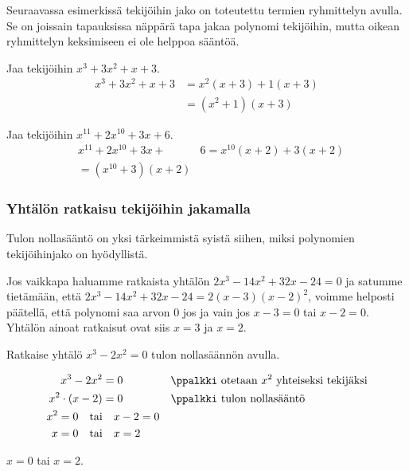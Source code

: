 Seuraavassa esimerkissä tekijöihin jako on toteutettu termien ryhmittelyn avulla. Se on joissain tapauksissa näppärä tapa jakaa polynomi tekijöihin, mutta oikean ryhmittelyn keksimiseen ei ole helppoa sääntöä.

\begin{esimerkki}
Jaa tekijöihin $x^3+3x^2+x+3$.
\begin{align*}
x^3+3x^2+x+3 &=x^2(x+3)+1(x+3) \\ &=(x^2+1)(x+3)
\end{align*}
\end{esimerkki}

\begin{esimerkki}
Jaa tekijöihin $x^{11}+2x^{10}+3x+6$.
\begin{align*}
& x^{11}+2x^{10}+3x+ &6=x^{10}(x+2)+3(x+2)\\ &=(x^{10}+3)(x+2)
\end{align*}
\end{esimerkki}

\subsubsection*{Yhtälön ratkaisu tekijöihin jakamalla}

Tulon nollasääntö on yksi tärkeimmistä syistä siihen, miksi polynomien tekijöihinjako on hyödyllistä.

Jos vaikkapa haluamme ratkaista yhtälön $2x^3-14x^2+32x-24=0$ ja satumme tietämään, että $2x^3-14x^2+32x-24=2(x-3)(x-2)^2$,
voimme helposti päätellä, että polynomi saa arvon $0$ jos ja vain jos $x-3=0$ tai $x-2=0$. Yhtälön ainoat ratkaisut ovat siis $x=3$ ja $x=2$.


\begin{esimerkki}
Ratkaise yhtälö $x^3-2x^2=0$ tulon nollasäännön avulla.
\begin{esimratk}
\begin{align*}
x^3-2x^2 &= 0 && \ppalkki \text{ otetaan } x^2 \text{ yhteiseksi tekijäksi} \\
x^2\cdot(x-2) &= 0 && \ppalkki \text{ tulon nollasääntö} \\
x^2=0 \textrm{\quad tai}& \quad x-2=0 \\
x=0 \textrm{\quad tai}& \quad x=2 \\
\end{align*}
\end{esimratk}
\begin{esimvast}
$x=0$ tai $x=2$.
\end{esimvast}
\end{esimerkki}

